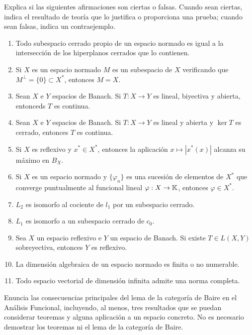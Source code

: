 \documentclass[12pt]{article}
\begin{document}
    \begin{ejercicio}
        Explica si las siguientes afirmaciones son ciertas o falsas. Cuando sean ciertas, indica el resultado de teoría que lo justifica o proporciona una prueba; cuando sean falsas, indica un contraejemplo.
        \begin{enumerate}[label=(\alph*)]
            \item Todo subespacio cerrado propio de un espacio normado es igual a la intersección de los hiperplanos cerrados que lo contienen.
            \item Si $X$ es un espacio normado $M$ es un subespacio de $X$ verificando que $M^\perp = \{0\}\subset X^\ast$, entonces $M = X$.
            \item Sean $X$ e $Y$ espacios de Banach. Si $T:X\to Y$ es lineal, biyectiva y abierta, entonceds $T$ es continua.
            \item Sean $X$ e $Y$ espacios de Banach. Si $T:X\to Y$ es lineal y abierta y $\ker T$ es cerrado, entonces $T$ es continua.
            \item Si $X$ es reflexivo y $x^\ast \in X^\ast$, entonces la aplicación $x\longmapsto |x^\ast(x)|$ alcanza su máximo en $B_X$.
            \item Si $X$ es un espacio normado y $\{\varphi_n\}$ es una sucesión de elementos de $X^\ast$ que converge puntualmente al funcional lineal $\varphi:X\to \mathbb{K}$, entonces $\varphi \in X^\ast$.
            \item $L_2$ es isomorfo al cociente de $l_1$ por un subespacio cerrado.
            \item $L_1$ es isomorfo a un subespacio cerrado de $c_0$.
            \item Sea $X$ un espacio reflexivo e $Y$ un espacio de Banach. Si existe $T\in L(X,Y)$ sobreyectiva, entonces $Y$ es reflexivo.
            \item La dimensión algebraica de un espacio normado es finita o no numerable.
            \item Todo espacio vectorial de dimensión infinita admite una norma completa.
        \end{enumerate}
    \end{ejercicio}

    \begin{ejercicio}
        Enuncia las consecuencias principales del lema de la categoría de Baire en el Análisis Funcional, incluyendo, al menos, tres resultados que se puedan considerar teoremas y alguna aplicación a un espacio concreto. No es necesario demostrar los teoremas ni el lema de la categoría de Baire.
    \end{ejercicio}
\end{document}
